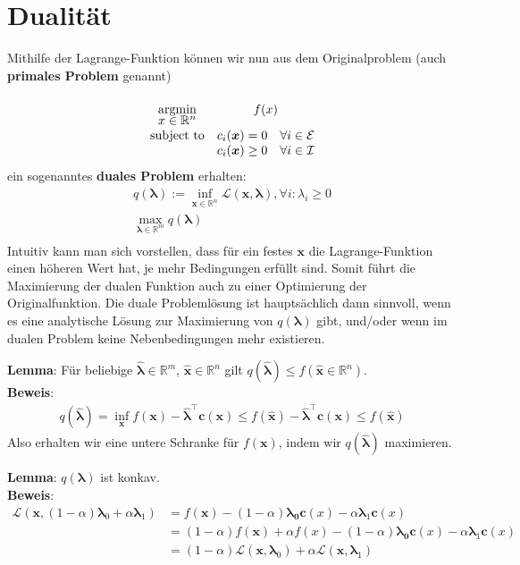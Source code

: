 \documentclass{report}
\newcommand{\tbf}{\textbf}
\newcommand{\argmin}[1] {
    \begin{array}{c}
        \vphantom{#1}\\[-3pt] %
        \text{argmin}\\[-3pt]
        #1\\
        \end{array}
    }
\newcommand*{\newpar}{\par\vspace{\baselineskip}\noindent}
\begin{document}
\section{Dualität}
Mithilfe der Lagrange-Funktion können wir nun aus dem Originalproblem (auch \tbf{primales Problem} genannt)
\begin{align*}
\begin{array}{cc}
\argmin{x \in \mathbb{R}^n} &f(x)\\
 \text{subject to} &c_i(\bm{x}) = 0 \quad \forall i \in \mathcal{E}\\
 &c_i(\bm{x}) \geq 0 \quad \forall i \in \mathcal{I}\\
\end{array}
\end{align*}
ein sogenanntes \tbf{duales Problem} erhalten:
\begin{align*}
q(\bm{\lambda}) := \inf_{\bm{x} \in \mathbb{R}^n} \mathcal{L}(\bm{x}, \bm{\lambda}), \forall i: \lambda_i \geq 0\\
 \max_{\bm{\lambda} \in \mathbb{R}^m} q(\bm{\lambda})\\
\end{align*}
Intuitiv kann man sich vorstellen, dass für ein festes $\bm{x}$ die Lagrange-Funktion einen höheren Wert hat, je mehr Bedingungen erfüllt sind. Somit führt die Maximierung der dualen Funktion auch zu einer Optimierung der Originalfunktion. Die duale Problemlösung ist hauptsächlich dann sinnvoll, wenn es eine analytische Lösung zur Maximierung von $q(\bm{\lambda})$ gibt, und/oder wenn im dualen Problem keine Nebenbedingungen mehr existieren.
\newpar
\tbf{Lemma}: Für beliebige $\hat{\bm{\lambda}} \in \mathbb{R}^m$, $\hat{\bm{x}} \in \mathbb{R}^n$ gilt $q(\hat{\bm{\lambda}}) \leq f(\hat{\bm{x}} \in \mathbb{R}^n)$.\\
\tbf{Beweis}:
\begin{align*}
 q(\hat{\bm{\lambda}}) = \inf_{\bm{x}} f(\bm{x}) - \hat{\bm{\lambda}}^\top \bm{c(x)} \leq f(\hat{\bm{x}}) - \hat{\bm{\lambda}}^\top \bm{c(x)} \leq f(\hat{\bm{x}})
\end{align*}
Also erhalten wir eine untere Schranke für $f(\bm{x})$, indem wir $q(\hat{\bm{\lambda}})$ maximieren.
\newpar
\tbf{Lemma}: $q(\bm{\lambda})$ ist konkav.\\
\tbf{Beweis}:
\begin{align*}
 \mathcal{L}(\bm{x}, (1-\alpha)\bm{\lambda}_0 + \alpha \bm{\lambda}_1) &= f(\bm{x}) - (1 - \alpha) \bm{\lambda_0} \bm{c}(x) - \alpha \bm{\lambda}_1 \bm{c}(x)\\
 &= (1-\alpha) f(\bm{x}) + \alpha f(x) - (1 - \alpha) \bm{\lambda_0} \bm{c}(x) - \alpha \bm{\lambda}_1 \bm{c}(x)\\
 &= (1- \alpha) \mathcal{L}(\bm{x},\bm{\lambda}_0) + \alpha \mathcal{L}(\bm{x},\bm{\lambda}_1)\\
\end{align*}
\end{document}
